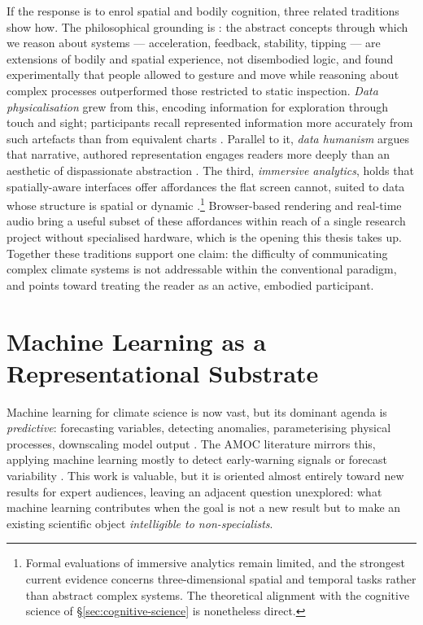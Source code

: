 If the response is to enrol spatial and bodily cognition, three related traditions show how. The philosophical grounding is \citet{lakoff1999}: the abstract concepts through which we reason about systems --- acceleration, feedback, stability, tipping --- are extensions of bodily and spatial experience, not disembodied logic, and \citet{kirsh2013} found experimentally that people allowed to gesture and move while reasoning about complex processes outperformed those restricted to static inspection. \emph{Data physicalisation} \citep{jansen2015} grew from this, encoding information for exploration through touch and sight; participants recall represented information more accurately from such artefacts than from equivalent charts \citep{moere2010}. Parallel to it, \emph{data humanism} argues that narrative, authored representation engages readers more deeply than an aesthetic of dispassionate abstraction \citep{lupi2017, segel2010}. The third, \emph{immersive analytics}, holds that spatially-aware interfaces offer affordances the flat screen cannot, suited to data whose structure is spatial or dynamic \citep{marriott2018}.\footnote{Formal evaluations of immersive analytics remain limited, and the strongest current evidence concerns three-dimensional spatial and temporal tasks rather than abstract complex systems. The theoretical alignment with the cognitive science of \S\ref{sec:cognitive-science} is nonetheless direct.} Browser-based rendering and real-time audio bring a useful subset of these affordances within reach of a single research project without specialised hardware, which is the opening this thesis takes up. Together these traditions support one claim: the difficulty of communicating complex climate systems is not addressable within the conventional paradigm, and points toward treating the reader as an active, embodied participant.

\section{Machine Learning as a Representational Substrate}
\label{sec:ml-climate}

Machine learning for climate science is now vast, but its dominant agenda is \emph{predictive}: forecasting variables, detecting anomalies, parameterising physical processes, downscaling model output \citep{reichstein2019, sonnewald2021}. The AMOC literature mirrors this, applying machine learning mostly to detect early-warning signals or forecast variability \citep{boers2021, ditlevsen2023}. This work is valuable, but it is oriented almost entirely toward new results for expert audiences, leaving an adjacent question unexplored: what machine learning contributes when the goal is not a new result but to make an existing scientific object \emph{intelligible to non-specialists}.

